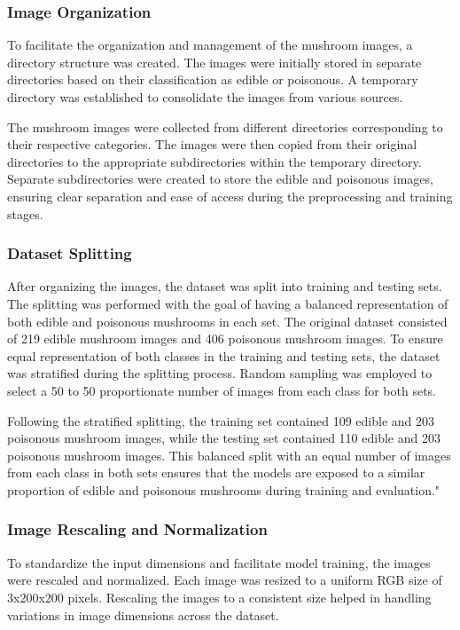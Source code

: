 \documentclass{article}
\begin{document}
\subsubsection{Image Organization}
To facilitate the organization and management of the mushroom images, a directory structure was created. The images were initially stored in separate directories based on their classification as edible or poisonous. A temporary directory was established to consolidate the images from various sources.

The mushroom images were collected from different directories corresponding to their respective categories. The images were then copied from their original directories to the appropriate subdirectories within the temporary directory. Separate subdirectories were created to store the edible and poisonous images, ensuring clear separation and ease of access during the preprocessing and training stages.

\subsubsection{Dataset Splitting}
After organizing the images, the dataset was split into training and testing sets. The splitting was performed with the goal of having a balanced representation of both edible and poisonous mushrooms in each set. The original dataset consisted of 219 edible mushroom images and 406 poisonous mushroom images. To ensure equal representation of both classes in the training and testing sets, the dataset was stratified during the splitting process. Random sampling was employed to select a 50 to 50 proportionate number of images from each class for both sets. 

Following the stratified splitting, the training set contained 109 edible and 203 poisonous mushroom images, while the testing set contained 110 edible and 203 poisonous mushroom images. This balanced split with an equal number of images from each class in both sets ensures that the models are exposed to a similar proportion of edible and poisonous mushrooms during training and evaluation."

\subsubsection{Image Rescaling and Normalization}
To standardize the input dimensions and facilitate model training, the images were rescaled and normalized. Each image was resized to a uniform RGB size of 3x200x200 pixels. Rescaling the images to a consistent size helped in handling variations in image dimensions across the dataset.
\end{document}
